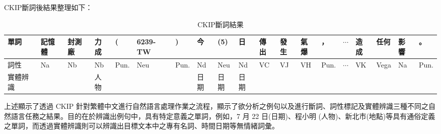 \newpage

CKIP斷詞後結果整理如下：
\begin{table}[H]
\begin{center}
\begin{tabular}[c]{l|m{0.3cm}<{\centering}m{0.3cm}<{\centering}m{0.3cm}<{\centering}m{0.5cm}<{\centering}m{0.5cm}<{\centering}m{0.5cm}<{\centering}m{0.3cm}<{\centering}m{0.5cm}<{\centering}m{0.3cm}<{\centering}m{0.3cm}<{\centering}m{0.3cm}<{\centering}m{0.3cm}<{\centering}m{0.5cm}<{\centering}m{0.3cm}<{\centering}m{0.3cm}<{\centering}m{0.5cm}<{\centering}m{0.2cm}<{\centering}m{0.3cm}<{\centering}}
\toprule
單詞& 記憶體 & 封測廠 & 力成 & ( & 6239-TW & ) & 今 & (5) & 日 & 傳出 & 發生 & 氣爆 & ， & $\cdots$ & 造成 & 任何 & 影響 & 。 \\
\hline
詞性 & Na & Nb & Nb & Pun. & Neu & Pun. & Nd & Neu & Nd & VC &  VJ & VH & Pun. & $\cdots$ & VK & Vega & Na & Pun. \\
\hline
實體辨識 &  &  & 人物 &  &  & & 日期 & 日期 & 日期 &  &  &  &  &  &  &  &  &  \\
\bottomrule
\end{tabular}
\end{center}
\caption{CKIP斷詞結果}
\label{Tab 4.2}
\end{table}
上述顯示了透過 CKIP 針對繁體中文進行自然語言處理作業之流程，顯示了欲分析之例句以及進行斷詞、詞性標記及實體辨識三種不同之自然語言任務之結果。目的在於辨識出例句中，具有特定意義之單詞，例如，7 月 22 日(日期)、程小明 (人物)、新北市(地點)等具有通俗定義之單詞，而透過實體辨識則可以辨識出目標文本中之專有名詞、時間日期等無情緒詞彙。
